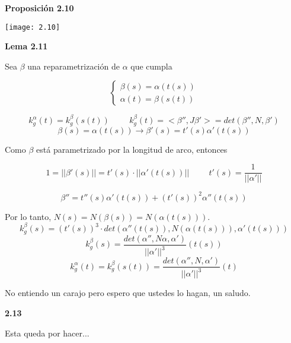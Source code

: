 \documentclass[openany]{book}
\begin{document}


\begin{center}
\textbf{Proposición 2.10}
\end{center}
\texttt{[image: 2.10]}

\begin{center}
\textbf{Lema 2.11}
\end{center}
\begin{demonstration}
  Sea $ \beta  $ una reparametrización de $ \alpha  $ que cumpla

  $$ \left\{ \begin{array}{l}
    \beta (s) = \alpha (t(s))\\
    \alpha (t) = \beta (s(t))
  \end{array} \right. $$

$$ k_g^\alpha (t) = k_g^\beta (s(t)) \hspace{1cm} k_g^\beta (t) = <\beta '', J \beta'> = det(\beta '', N, \beta ') $$
$$ \beta (s) = \alpha (t(s)) \to \beta '(s) = t'(s) \alpha '(t(s)) $$

Como $\beta $ está parametrizado por la longitud de arco, entonces

$$ 1=||\beta '(s)||=t'(s) \cdot ||\alpha '(t(s))|| \hspace{1cm}t'(s) = \dfrac{1}{||\alpha '||} $$

$$ \beta '' = t''(s) \alpha '(t(s))  + (t'(s))^2 \alpha ''(t(s))$$

Por lo tanto, $N(s) = N(\beta (s))= N(\alpha (t(s)))$.
$$ k_g^\beta (s) = (t'(s))^3 \cdot det(\alpha ''(t(s)), N(\alpha (t(s))), \alpha '(t(s))) $$
$$ k_g^\beta (s) = \dfrac{det(\alpha '', N \alpha , \alpha ' )}{||\alpha '||^3}(t(s))  $$
$$ k_g^\alpha (t) = k_g^\beta (s(t)) = \dfrac{det(\alpha '', N , \alpha ' )}{||\alpha '||^3}(t)  $$

No entiendo un carajo pero espero que ustedes lo hagan, un saludo.
\end{demonstration}

\begin{center}
\textbf{2.13}
\end{center}
\begin{demonstration}
  Esta queda por hacer...
\end{demonstration}
\end{document}
